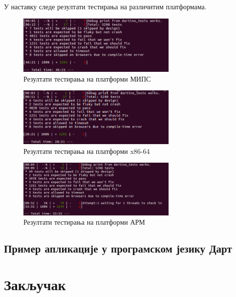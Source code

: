 \documentclass[12pt,oneside]{memoir}
\begin{document}
У наставку следе резултати тестирања на различитим платформама.

\begin{figure}[!ht]
  \centering
  \includegraphics[width=0.7\textwidth]{testovi-mips.png}
  \caption{Резултати тестирања на платформи МИПС}
  \label{fig:mips}
\end{figure}

\begin{figure}[!ht]
  \centering
  \includegraphics[width=0.7\textwidth]{testovi_x64.png}
  \caption{Резултати тестирања на платформи x86-64}
  \label{fig:x86}
\end{figure}

\begin{figure}[!ht]
  \centering
  \includegraphics[width=0.7\textwidth]{testovi-arm.png}
  \caption{Резултати тестирања на платформи АРМ }
  \label{fig:arm}
\end{figure}

\section{Пример апликације у програмском језику Дарт}


\chapter{Закључак}
\end{document}
